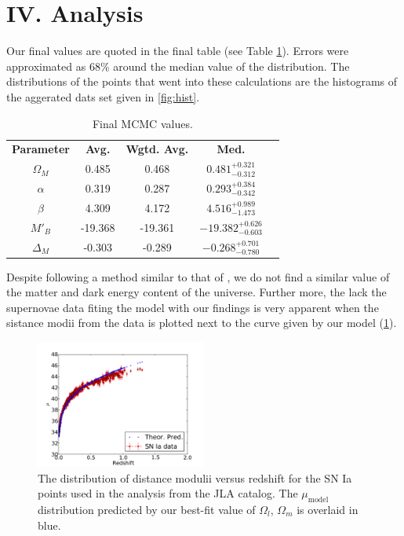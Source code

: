 \documentclass[aps,prl,reprint]{revtex4-1}
\begin{document}
\section{IV. Analysis} 
Our final values are quoted in the final table (see Table \ref{tblv}). Errors were approximated as 68\% around the median value of the distribution. The distributions of the points that went into these calculations are the histograms of the aggerated dats set given in \cref{fig:hist}.
\begin{table}
\begin{center}
\def\arraystretch{1.5}
\begin{tabular}{ |c|c|c|c|c| } 
 \hline
 \textbf{Parameter} & \textbf{Avg.} & \textbf{Wgtd. Avg.} & \textbf{Med.} \\ 
 $\Omega_M$ & 0.485 & 0.468 & $0.481^{+0.321}_{-0.312}$\\ 
 $\alpha$ & 0.319 & 0.287 & $0.293^{+0.384}_{-0.342}$\\ 
 $\beta$ & 4.309 & 4.172 &  $4.516^{+0.989}_{-1.473}$\\ 
 $M'_B$ & -19.368 & -19.361 & $-19.382^{+0.626}_{-0.603}$ \\ 
$\Delta_M$ & -0.303 &-0.289 & $-0.268^{+0.701}_{-0.780}$ \\
 \hline
\end{tabular}
 \caption{Final MCMC values.}\label{tblv}
\end{center}
\end{table}
Despite following a method similar to that of \citep{sdss}, we do not find a similar value of the matter and dark energy content of the universe. Further more, the lack the supernovae data fiting the model with our findings is very apparent when the sistance modii from the data is plotted next to the curve given by our model (\cref{fig:mu}).

\begin{figure}
 \includegraphics[width=0.5\textwidth]{../plots/mu.pdf}
\caption{\label{fig:mu}The distribution of distance modulii versus redshift for the SN Ia points used in the analysis from the JLA catalog. The $\mu_\text{model}$ distribution predicted by our best-fit value of $\Omega_l$, $\Omega_m$ is overlaid in blue.}
\end{figure}
\end{document}
